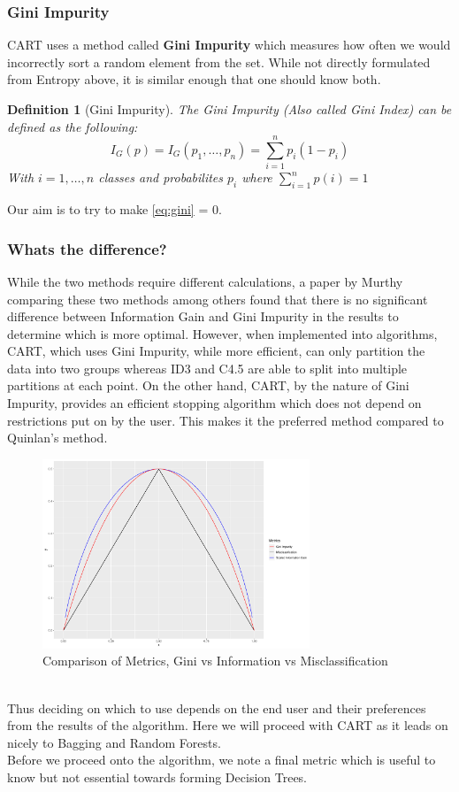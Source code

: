 \documentclass[11pt,a4paper]{report}
\newtheorem{definition}{Definition}
\begin{document}
\subsubsection{Gini Impurity}
CART uses a method called \textbf{Gini Impurity} which measures how often we would incorrectly sort a random element from the set. 
While not directly formulated from Entropy above, it is similar enough that one should know both.
\begin{definition}[Gini Impurity]
The Gini Impurity (Also called Gini Index) can be defined as the following:
\begin{equation}
    I_G (p) = I_G (p_1, \dots, p_n) = \sum_{i=1}^{n} p_i(1-p_i) 
    \label{eq:gini}
\end{equation}
With $i=1,\dots,n$ classes and probabilites $p_i$ where $\sum_{i=1}^{n} p(i) = 1$
\end{definition} \cite{BreimanDT}
Our aim is to try to make \ref{eq:gini} = 0. 


\subsubsection{Whats the difference?}
While the two methods require different calculations, a paper by Murthy comparing these two methods among others \cite{murthy1995} found that there is no significant difference between Information Gain and Gini Impurity in the results to determine which is more optimal. 
However, when implemented into algorithms, CART, which uses Gini Impurity, while more efficient, can only partition the data into two groups whereas ID3 and C4.5 are able to split into multiple partitions at each point.
On the other hand, CART, by the nature of Gini Impurity, provides an efficient stopping algorithm which does not depend on restrictions put on by the user. This makes it the preferred method compared to Quinlan's method.
\begin{figure}
    \centering
    \includegraphics[width=8cm]{reportcharts/Metriccomp.pdf}
    \caption{Comparison of Metrics, Gini vs Information vs Misclassification}
    \label{fig:metrics}
\end{figure}
\medskip\\
Thus deciding on which to use depends on the end user and their preferences from the results of the algorithm. Here we will proceed with CART as it leads on nicely to Bagging and Random Forests.
\medskip\\
Before we proceed onto the algorithm, we note a final metric which is useful to know but not essential towards forming Decision Trees.
\end{document}
